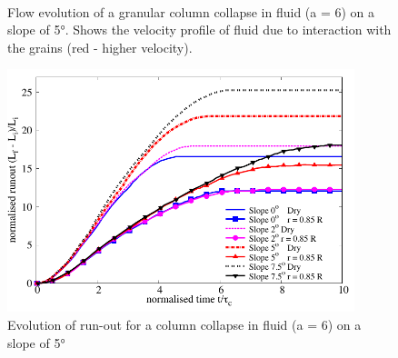 \begin{figure}
\ContinuedFloat
{}\\
\caption{Flow evolution of a granular column collapse in fluid (a = 6) on a 
slope of 5\si{\degree}. Shows the velocity profile of fluid due to interaction 
with the grains (red - higher 
velocity).}
\label{fig:a6_slope_snapshots}
\end{figure}


\begin{figure}[htpb]
\centering
\includegraphics[width=0.9\textwidth]{Runout_a6_slope}
\caption{Evolution of run-out for a column collapse in fluid (a = 6) on a 
slope of 5\si{\degree}}
\label{fig:Runout_a6_slope}
\end{figure}

